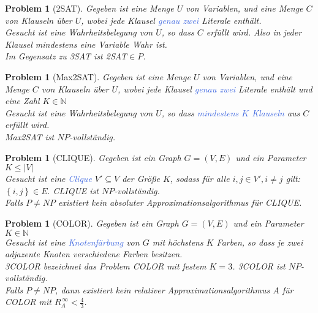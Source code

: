 \documentclass[11pt]{article}
\newcommand{\tcol}[1]{\textcolor{RoyalBlue}{#1}}
\newcommand{\set}[1]{\left\lbrace #1\right\rbrace}
\theoremstyle{break}
\newtheorem{prob}[satz]{Problem}
\begin{document}
    \begin{prob}[2SAT]
        Gegeben ist eine Menge $U$ von Variablen, und eine Menge $C$ von Klauseln über $U$, wobei jede Klausel \tcol{genau zwei} Literale enthält.\\
        Gesucht ist eine Wahrheitsbelegung von $U$, so dass $C$ erfüllt wird.
        Also in jeder Klausel mindestens eine Variable Wahr ist.\\
        Im Gegensatz zu 3SAT ist 2SAT$\in P$.
    \end{prob}

    \begin{prob}[Max2SAT]
        Gegeben ist eine Menge $U$ von Variablen, und eine Menge $C$ von Klauseln über $U$, wobei jede Klausel \tcol{genau zwei} Literale enthält und eine Zahl $K\in\mathbb{N}$\\
        Gesucht ist eine Wahrheitsbelegung von $U$, so dass \tcol{mindestens $K$ Klauseln} aus $C$ erfüllt wird.\\
        Max2SAT ist $NP$-vollständig.
    \end{prob}

    \begin{prob}[CLIQUE]
        Gegeben ist ein Graph $G=(V,E)$ und ein Parameter $K\leq |V|$\\
        Gesucht ist eine \tcol{Clique} $V'\subseteq V$ der Größe $K$, sodass für alle $i,j\in V', i\neq j$ gilt: $\set{i,j}\in E.$
        CLIQUE ist $NP$-vollständig.\\
        Falls $P\neq NP$ existiert kein absoluter Approximationsalgorithmus für CLIQUE\@.
    \end{prob}

    \begin{prob}[COLOR]
        Gegeben ist ein Graph $G=(V,E)$ und ein Parameter $K\in\mathbb{N}$\\
        Gesucht ist eine \tcol{Knotenfärbung} von $G$ mit höchstens $K$ Farben, so dass je zwei adjazente Knoten verschiedene Farben besitzen.\\
        3COLOR bezeichnet das Problem COLOR mit festem $K=3$.
        3COLOR ist $NP$-vollständig.\\
        Falls $P\neq NP$, dann existiert kein relativer Approximationsalgorithmus $A$ für COLOR mit $R^{\,\infty}_A<\frac{4}{3}$.
    \end{prob}
\end{document}
